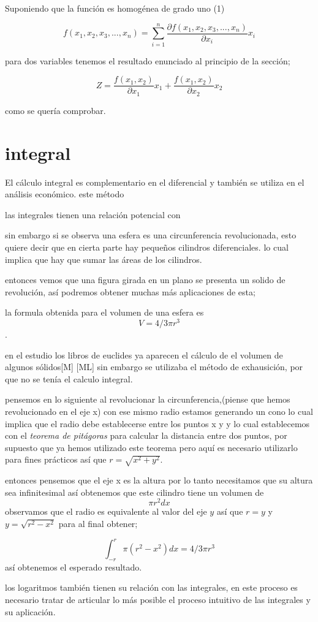 \documentclass[12pt]{article}
\begin{document}
Suponiendo que la función es homogénea de grado uno (1) 


$$f(x_1,x_2,x_3,...,x_n)= \sum_{i=1}^{n}  \dfrac{\partial f(x_1,x_2,x_3,...,x_n)}{\partial x_{i}}x_{i}   $$


para dos variables tenemos el resultado enunciado al principio de la sección; 

$$Z = \dfrac{f(x_{1},x_{2})}{\partial x_{1}}x_{1} + \dfrac{f(x_{1},x_{2})}{\partial x_{2}}x_{2}$$

como se quería comprobar.



\section{integral}

El cálculo integral es complementario en el diferencial y también se utiliza en el análisis económico. este método


las integrales tienen una relación potencial con 





sin embargo si se observa una esfera es una circunferencia revolucionada, esto quiere decir que en cierta parte hay pequeños cilindros diferenciales.
lo cual implica que hay que sumar las áreas de los cilindros.

entonces vemos que una figura girada en un plano se presenta un solido de revolución, así podremos obtener muchas más aplicaciones de esta;

la formula obtenida para el volumen de una esfera es
$$ V=4/3 \pi r^{3}$$.

en el estudio los libros de euclides ya aparecen el cálculo de el volumen de algunos sólidos[M] [ML] sin embargo se utilizaba el método de exhausición, por que no se tenía el calculo integral.

pensemos en lo siguiente al revolucionar la circunferencia,(piense que hemos revolucionado en el eje x) con ese mismo radio estamos generando un cono lo cual implica que el radio debe establecerse entre los puntos x y y lo cual establecemos  con el \emph{teorema de pitágoras} para calcular la distancia entre dos puntos, por supuesto que ya hemos utilizado este teorema pero aquí es necesario utilizarlo para fines prácticos así que $r=\sqrt{x^2+y^2}$.

entonces pensemos que el eje x es la altura por lo tanto necesitamos que su altura sea infinitesimal así obtenemos que este cilindro tiene un volumen de 
$$ \pi r^{2} dx$$
observamos que el radio es equivalente al valor del eje $y$ así que $r=y$ y $y=\sqrt{r^2-x^2}$ para al final obtener;

$$\int_{-r}^{r} \pi(r^{2}-x^{2}) dx =4/3 \pi r^{3} $$ así obtenemos el esperado resultado.


los logaritmos también tienen su relación con las integrales, en este proceso es necesario tratar de articular lo más posible el proceso intuitivo de las integrales y su aplicación.
\end{document}
